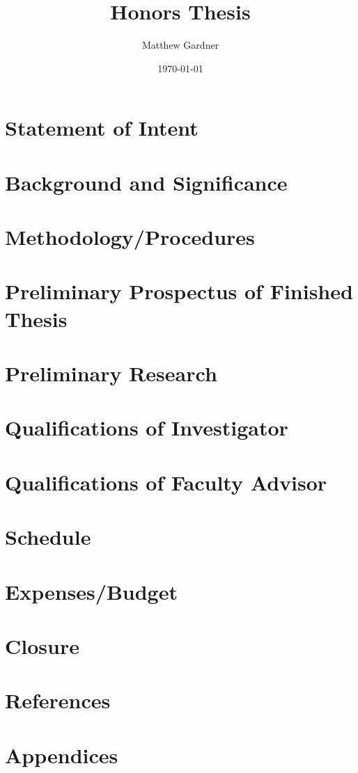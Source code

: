 \documentclass[onecolumn, 12pt]{article}
\title{Honors Thesis}
\author{Matthew Gardner}
\date{\today}
\begin{document}
\maketitle

\section{Statement of Intent}

\section{Background and Significance}

\section{Methodology/Procedures}

\section{Preliminary Prospectus of Finished Thesis}

\section{Preliminary Research}

\section{Qualifications of Investigator}

\section{Qualifications of Faculty Advisor}

\section{Schedule}

\section{Expenses/Budget}

\section{Closure}

\section{References}

\section{Appendices}
\end{document}

